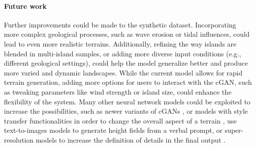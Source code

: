 
\paragraph{Future work}
Further improvements could be made to the synthetic dataset. Incorporating more complex geological processes, such as wave erosion or tidal influences, could lead to even more realistic terrains. Additionally, refining the way islands are blended in multi-island samples, or adding more diverse input conditions (e.g., different geological settings), could help the model generalize better and produce more varied and dynamic landscapes.  While the current model allows for rapid terrain generation, adding more options for users to interact with the cGAN, such as tweaking parameters like wind strength or island size, could enhance the flexibility of the system. 
Many other neural network models could be exploited to increase the possibilities, such as newer variants of cGANs \cite{Park2019}, or models with style transfer functionalities \cite{Gatys2015,Zhu2020} in order to change the overall aspect of a terrain \cite{Perche2023a,Perche2023b}, use text-to-images models \cite{Rombach2021,Radford2021} to generate height fields from a verbal prompt, or super-resolution models \cite{Dong2014} to increase the definition of details in the final output \cite{Guerin2016a}.







